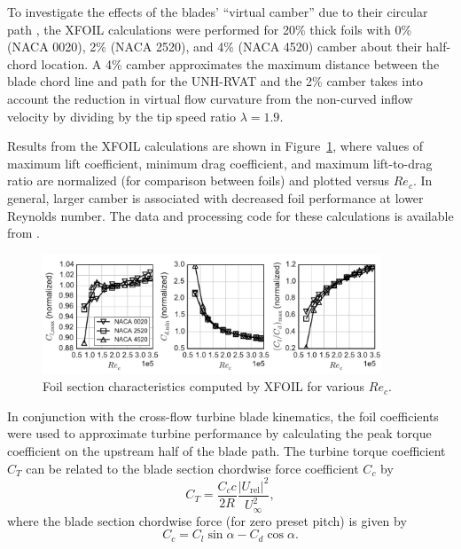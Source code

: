 \documentclass[energies,article,accept,moreauthors,pdftex,12pt,a4paper]{mdpi}
\begin{document}
To investigate the effects of the blades' ``virtual camber'' due to their
circular path \cite{Migliore1980}, the XFOIL calculations were performed for
20\% thick foils with 0\% (NACA 0020), 2\% (NACA 2520), and 4\% (NACA 4520)
camber about their half-chord location. A 4\% camber approximates the maximum
distance between the blade chord line and path for the UNH-RVAT and the 2\%
camber takes into account the reduction in virtual flow curvature from the
non-curved inflow velocity by dividing by the tip speed ratio $\lambda=1.9$.

Results from the XFOIL calculations are shown in Figure~\ref{fig:foil-Re-dep},
where values of maximum lift coefficient, minimum drag coefficient, and maximum
lift-to-drag ratio are normalized (for comparison between foils) and plotted
versus $Re_c$. In general, larger camber is associated with decreased foil
performance at lower Reynolds number. The data and processing code for these
calculations is available from \cite{Bachant2015-NACAXX20-XFOIL}.

\begin{figure}[ht!]
\centering
\includegraphics[width=0.9\textwidth]{figures/all_foils_re_dep}
\caption{Foil section characteristics computed by XFOIL for various $Re_c$.}
\label{fig:foil-Re-dep}
\end{figure}

In conjunction with the cross-flow turbine blade kinematics, the foil
coefficients were used to approximate turbine performance by calculating the
peak torque coefficient on the upstream half of the blade path. The turbine
torque coefficient $C_T$ can be related to the blade section chordwise force
coefficient $C_c$ by
\begin{equation}
C_T = \frac{C_c c}{2R} \frac{|U_\mathrm{rel}|^2}{U_\infty^2},
\end{equation}
where the blade section chordwise force (for zero preset pitch) is given by
\begin{equation}
C_c = C_l \sin \alpha - C_d \cos \alpha.
\end{equation}
\end{document}
